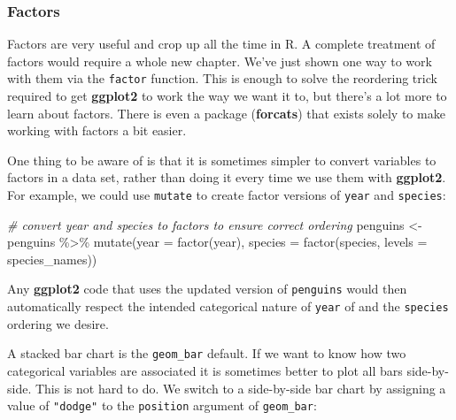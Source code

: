 \documentclass[
]{book}
\newenvironment{Shaded}{\begin{snugshade}}{\end{snugshade}}
\newcommand{\AttributeTok}[1]{\textcolor[rgb]{0.77,0.63,0.00}{#1}}
\newcommand{\CommentTok}[1]{\textcolor[rgb]{0.56,0.35,0.01}{\textit{#1}}}
\newcommand{\FunctionTok}[1]{\textcolor[rgb]{0.00,0.00,0.00}{#1}}
\newcommand{\NormalTok}[1]{#1}
\newcommand{\OtherTok}[1]{\textcolor[rgb]{0.56,0.35,0.01}{#1}}
\newcommand{\SpecialCharTok}[1]{\textcolor[rgb]{0.00,0.00,0.00}{#1}}
\newenvironment{greybox}{
  \definecolor{shadecolor}{rgb}{0.95,0.95,0.95}  %
  \color{black}
  \begin{shaded}}
 {\end{shaded}}
\newenvironment{infobox}[1]
  {
  \begin{itemize}
  \renewcommand{\labelitemi}{
    \raisebox{-.7\height}[0pt][0pt]{
      {\setkeys{Gin}{width=3em,keepaspectratio}
        \texttt{[image: images/\#1]}}
    }
  }
  \setlength{\fboxsep}{1em}
  \begin{greybox}
  \item
  }
  {
  \end{greybox}
  \end{itemize}
  }
\begin{document}
\begin{infobox}{warning}

\hypertarget{factors}{%
\subsubsection*{Factors}\label{factors}}

Factors are very useful and crop up all the time in R. A complete treatment of factors would require a whole new chapter. We've just shown one way to work with them via the \texttt{factor} function. This is enough to solve the reordering trick required to get \textbf{ggplot2} to work the way we want it to, but there's a lot more to learn about factors. There is even a package (\textbf{forcats}) that exists solely to make working with factors a bit easier.

One thing to be aware of is that it is sometimes simpler to convert variables to factors in a data set, rather than doing it every time we use them with \textbf{ggplot2}. For example, we could use \texttt{mutate} to create factor versions of \texttt{year} and \texttt{species}:

\begin{Shaded}
\begin{Highlighting}[]
\CommentTok{\# convert year and species to factors to ensure correct ordering }
\NormalTok{penguins }\OtherTok{\textless{}{-}}\NormalTok{ penguins }\SpecialCharTok{\%\textgreater{}\%} 
  \FunctionTok{mutate}\NormalTok{(}\AttributeTok{year    =} \FunctionTok{factor}\NormalTok{(year),}
         \AttributeTok{species =} \FunctionTok{factor}\NormalTok{(species, }\AttributeTok{levels =}\NormalTok{ species\_names)) }
\end{Highlighting}
\end{Shaded}

Any \textbf{ggplot2} code that uses the updated version of \texttt{penguins} would then automatically respect the intended categorical nature of \texttt{year} of and the \texttt{species} ordering we desire.

\end{infobox}

A stacked bar chart is the \texttt{geom\_bar} default. If we want to know how two categorical variables are associated it is sometimes better to plot all bars side-by-side. This is not hard to do. We switch to a side-by-side bar chart by assigning a value of \texttt{"dodge"} to the \texttt{position} argument of \texttt{geom\_bar}:
\end{document}
